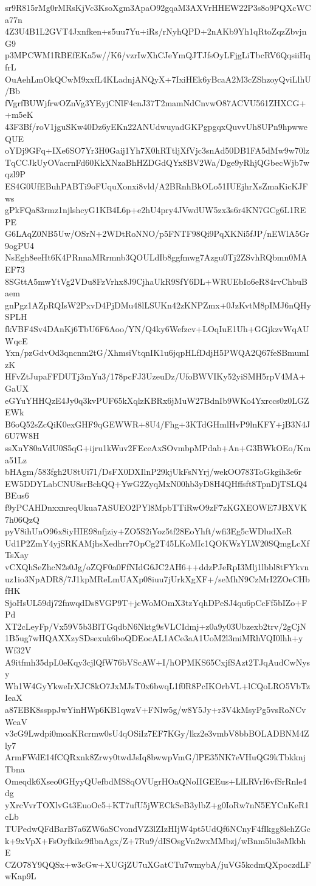 sr9R815rMg0rMRsKjVc3KsoXgm3ApaO92gqaM3AXVrHHEW22P3s8o9PQXcWCa77n
4Z3U4B1L2GVT4Jxnfken+s5uu7Yu+iRs/rNyhQPD+2nAKb9Yh1qRtoZqzZbvjnG9
p3MPCWM1RBEfEKa5w//K6/vzrIwXhCJeYmQJTJfsOyLFjgLiTbcRV6QqsiiHqfrL
OuAehLmOkQCwM9xxfL4KLadnjANQyX+7IxiHEk6yBcaA2M3cZShzoyQviLlhU/Bb
fVgrfBUWjfrwOZnVg3YEyjCNlF4cnJ37T2mamNdCnvwO87ACVU561ZHXCG++m5eK
43F3Bf/roV1jguSKw40Dz6yEKn22ANUdwuyadGKPgpgqxQuvvUh8UPn9hpwweQUE
oYDj9GFq+IXe6SO7Yr3H0Gaij1Yh7X0hRTtljXfVjc3snAd50DB1FA5dMw9w70lz
TqCCJkUyOVacrnFd60KkXNzaBhHZDGdQYx8BV2Wa/Dge9yRhjQGbecWjb7wqzl9P
ES4G0UfEBuhPABTi9oFUquXonxi8vld/A2BRnhBkOLo51IUEjhrXsZmaKicKJFws
gPkFQa83rmz1njlshcyG1KB4L6p+e2hU4pry4JVwdUW5zx3s6r4KN7GCg6L1REPE
G6LAqZ0NB5Uw/OSrN+2WDtRoNNO/p5FNTF98Qi9PqXKNi5fJP/nEWlA5Gr9ogPU4
NsEgh8eeHt6K4PRnnaMRrmnb3QOULdIb8ggfmwg7Azgu0Tj2ZSvhRQbmn0MAEF73
8SGttA5mwYtVg2VDu8FzVrhx8J9CjhaUkR9SfY6DL+WRUEbIo6eR84rvChbuBaem
gnPgz1AZpRQIsW2PxvD4PjDMu48lLSUKn42zKNPZmx+0JzKvtM8pIMJ6nQHySPLH
fkVBF4Sv4DAnKj6TbU6F6Aoo/YN/Q4ky6Wefzcv+LOqIuE1Uh+GGjkzvWqAUWqcE
Yxn/pzGdvOd3qncnm2tG/XhmsiVtqnIK1u6jqpHLfDdjH5PWQA2Q67feSBmumIzK
HFvZtJupaFFDUTj3mYu3/178pcFJ3UzeuDz/UfoBWVIKy52yiSMH5rpV4MA+GaUX
eGYuYHHQzE4Jy0q3kvPUF65kXqlzKBRx6jMuW27BdnIb9WKo4Yxrccs0z0LGZEWk
B6oQ52sZcQiK0exGHF9qGEWWR+8U4/Fhg+3KTdGHmlHvP9lnKFY+jB3N4J6U7W8H
ssXnY80aVdU0S5qG+ijru1kWuv2FEceAxSOvmbpMPdab+An+G3BWkOEo/Kma51Lz
bHAgm/583fgh2U8tUi71/DsFX0DXIlnP29kjUkFsNYrj/wekOO783ToGkgih3e6r
EW5DDYLabCNU8srBchQQ+YwG2ZyqMxN00hb3yD8H4QHffsft8TpnDjTSLQ4BEus6
f9yPCAHDnxxnreqUkua7ASUEO2PYl8MpbTTiRwO9zF7zKGXEOWE7JBXVK7h06QzQ
pyV8ihUnO96x8iyHIE98nfjziy+ZO5S2iYoz5tf28EoYhft/wfi3Eg5cWDludXeR
Ud1P2ZmY4yjSRKAMjhsXedhrr7OpCg2T45LKoMIc1QOKWzYLW20SQmgLcXfTsXay
vCXQhSeZhcN2s0Jg/oZQF0a0FfNIdG6JC2AH6++ddzPJeRpI3Mlj1lbbl8tFYkvn
uz1io3NpADR8/7J1kpMReLmUAXp08iuu7jUrkXgXF+/seMhN9CzMrI2ZOeCHbfHK
SjoHsUL59dj72fnwqdDs8VGP9T+jcWoMOmX3tzYqhDPeSJ4qu6pCcFf5bIZo+FPd
XT2cLeyFp/Vx59V5b3BlTGqdbN6Nktg9sVLCIdmj+z0a9y03Ubzexb2trv/2gCjN
1B5ug7wHQAXXzySDsexuk6boQDEocAL1ACe3aA1UoM2l3miMRhVQI0lhh+yWf32V
A9itfmh35dpL0eKqy3cjlQfW76bVScAW+I/hOPMKS65CxjfSAzt2TJqAudCwNysy
Wh1W4GyYkweIrXJC8kO7JxMJsT0x6bwqL1f0R8PcIKOrbVL+lCQoLRO5VbTzIeaX
a87EBK8ssppJwYinHWp6KB1qwzV+FNlw5g/w8Y5Jy+r3V4kMsyPg5vsRoNCvWeaV
v3cG9Lwdpi0moaKRcrmw0sU4qOSiIz7EF7KGy/lkz2e3vmbV8bbBOLADBNM4Zly7
ArmFWdE14fCQRxnk8Zrwy0twdJsIq8bwwpVmG/lPE35NK7eVHuQG9kTbkknjTbna
Omeqdk6Xseo0GHyyQUefbdMS8qOVUgrHOaQNoIIGEEus+LlLRVrI6vfSrRnle4dg
yXrcVvrTOXlvGt3EuoOc5+KT7ufU5jWECkSeB3ylbZ+g0IoRw7nN5EYCnKeR1cLb
TUPedwQFdBarB7a6ZW6aSCvondVZ3lZIzHIjW4pt5UdQf6NCnyF4fIkgg8lehZGc
k+9xVpX+FsOyfkikc9flbnAgx/Z+7Ru9/dISOsgVn2wxMMbzj/wBnm5lu3sMkbhE
CZO78Y9QQSx+w3cGw+XUGjZU7uXGatCTu7wmybA/juVG5kcdmQXpoczdLFwKap9L
